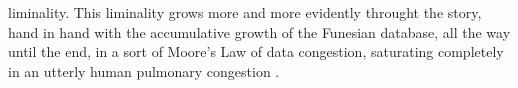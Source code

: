 liminality. This liminality grows more and more evidently throught the story, hand in hand with the accumulative growth of the Funesian database, all the way until the end, in a sort of Moore's Law of data congestion, saturating completely in an utterly human pulmonary congestion \parencite{Ovi19:Mem}.






